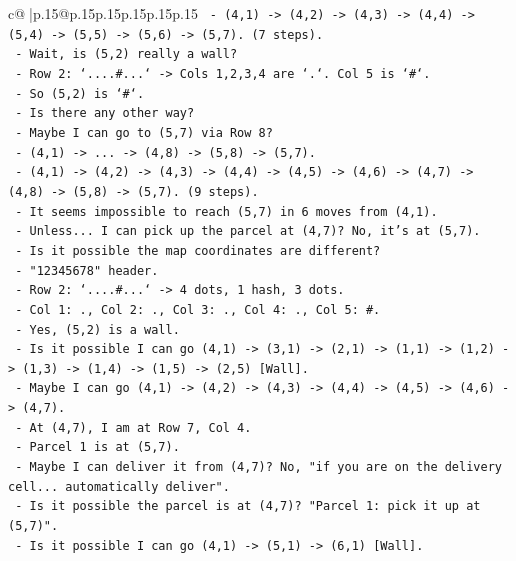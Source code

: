 \documentclass{article}
\begin{document}
{\begin{supertabular}{c@{$\;$}|p{.15\linewidth}@{}p{.15\linewidth}p{.15\linewidth}p{.15\linewidth}p{.15\linewidth}p{.15\linewidth}}
{{{\texttt{       {-} (4,1) {-}> (4,2) {-}> (4,3) {-}> (4,4) {-}> (5,4) {-}> (5,5) {-}> (5,6) {-}> (5,7). (7 steps).} \\
\texttt{     {-} Wait, is (5,2) really a wall?} \\
\texttt{       {-} Row 2: `....\#...` {-}> Cols 1,2,3,4 are `.`. Col 5 is `\#`.} \\
\texttt{       {-} So (5,2) is `\#`.} \\
\texttt{     {-} Is there any other way?} \\
\texttt{       {-} Maybe I can go to (5,7) via Row 8?} \\
\texttt{       {-} (4,1) {-}> ... {-}> (4,8) {-}> (5,8) {-}> (5,7).} \\
\texttt{       {-} (4,1) {-}> (4,2) {-}> (4,3) {-}> (4,4) {-}> (4,5) {-}> (4,6) {-}> (4,7) {-}> (4,8) {-}> (5,8) {-}> (5,7). (9 steps).} \\
\texttt{     {-} It seems impossible to reach (5,7) in 6 moves from (4,1).} \\
\texttt{     {-} Unless... I can pick up the parcel at (4,7)? No, it's at (5,7).} \\
\texttt{     {-} Is it possible the map coordinates are different?} \\
\texttt{       {-} "12345678" header.} \\
\texttt{       {-} Row 2: `....\#...` {-}> 4 dots, 1 hash, 3 dots.} \\
\texttt{       {-} Col 1: ., Col 2: ., Col 3: ., Col 4: ., Col 5: \#.} \\
\texttt{       {-} Yes, (5,2) is a wall.} \\
\texttt{     {-} Is it possible I can go (4,1) {-}> (3,1) {-}> (2,1) {-}> (1,1) {-}> (1,2) {-}> (1,3) {-}> (1,4) {-}> (1,5) {-}> (2,5) {[}Wall{]}.} \\
\texttt{     {-} Maybe I can go (4,1) {-}> (4,2) {-}> (4,3) {-}> (4,4) {-}> (4,5) {-}> (4,6) {-}> (4,7).} \\
\texttt{     {-} At (4,7), I am at Row 7, Col 4.} \\
\texttt{     {-} Parcel 1 is at (5,7).} \\
\texttt{     {-} Maybe I can deliver it from (4,7)? No, "if you are on the delivery cell... automatically deliver".} \\
\texttt{     {-} Is it possible the parcel is at (4,7)? "Parcel 1: pick it up at (5,7)".} \\
\texttt{     {-} Is it possible I can go (4,1) {-}> (5,1) {-}> (6,1) {[}Wall{]}.} \\
}}}
\end{supertabular}}
\end{document}
